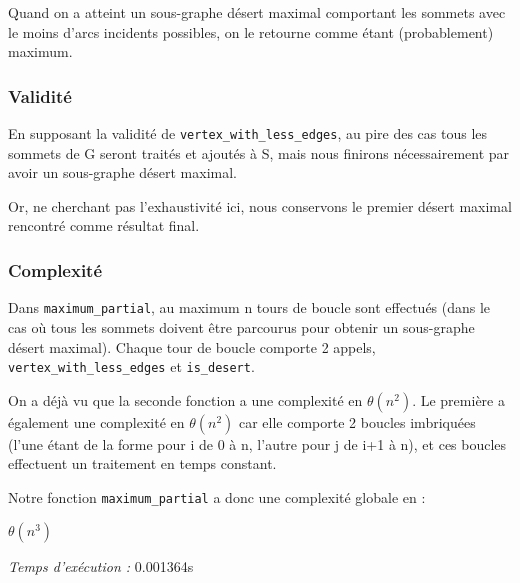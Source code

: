 Quand on a atteint un sous-graphe désert maximal comportant les sommets avec le moins d'arcs incidents possibles, on le retourne comme étant (probablement) maximum. 

\subsubsection{Validité}

En supposant la validité de \verb|vertex_with_less_edges|, au pire des cas tous les sommets de G seront traités et ajoutés à S, mais nous finirons nécessairement par avoir un sous-graphe désert maximal. 

Or, ne cherchant pas l'exhaustivité ici, nous conservons le premier désert maximal rencontré comme résultat final. 

\subsubsection{Complexité}

Dans \verb|maximum_partial|, au maximum n tours de boucle sont effectués (dans le cas où tous les sommets doivent être parcourus pour obtenir un sous-graphe désert maximal). Chaque tour de boucle comporte 2 appels, \verb|vertex_with_less_edges| et \verb|is_desert|.

On a déjà vu que la seconde fonction a une complexité en $\theta(n^2)$. Le première a également une complexité en $\theta(n^2)$ car elle comporte 2 boucles imbriquées (l'une étant de  la forme pour i de 0 à n, l'autre pour j de i+1 à n), et ces boucles effectuent un traitement en temps constant. 

Notre fonction \verb|maximum_partial| a donc une complexité globale en :

$\theta(n^3)$

\emph{Temps d'exécution :} 0.001364s

